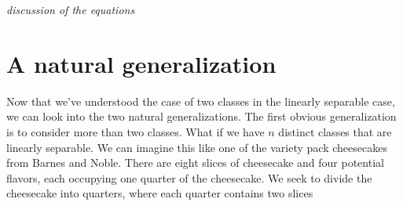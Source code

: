 \documentclass[]{article}
\begin{document}
{\it discussion of the equations}

\section{A natural generalization}

Now that we've understood the case of two classes in the linearly separable case, we can look into the two natural generalizations.  The first obvious generalization is to consider more than two classes.  What if we have $n$ distinct classes that are linearly separable.  We can imagine this like one of the variety pack cheesecakes from Barnes and Noble.  There are eight slices of cheesecake and four potential flavors, each occupying one quarter of the cheesecake.  We seek to divide the cheesecake into quarters, where each quarter contains two slices 
\end{document}
